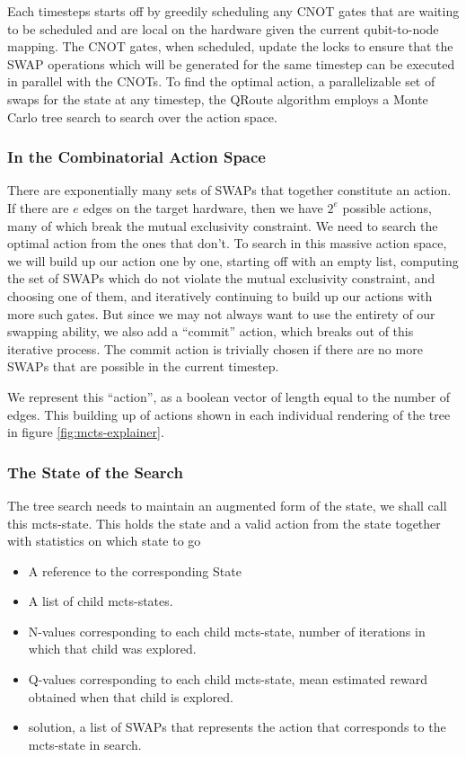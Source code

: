 \documentclass[%
 reprint,
 amsmath,amssymb,
 aps,
]{revtex4-2}
\begin{document}
Each timesteps starts off by greedily scheduling any CNOT gates that are waiting to be scheduled and are local on the hardware given the current qubit-to-node mapping. The CNOT gates, when scheduled, update the locks to ensure that the SWAP operations which will be generated for the same timestep can be executed in parallel with the CNOTs.
To find the optimal action, a parallelizable set of swaps for the state at any timestep, the QRoute algorithm employs a Monte Carlo tree search to search over the action space.

\subsubsection{\label{sec:method-mcts-state}In the Combinatorial Action Space}

There are exponentially many sets of SWAPs that together constitute an action. If there are $e$ edges on the target hardware, then we have $2^e$ possible actions, many of which break the mutual exclusivity constraint. We need to search the optimal action from the ones that don't. To search in this massive action space, we will build up our action one by one, starting off with an empty list, computing the set of SWAPs which do not violate the mutual exclusivity constraint, and choosing one of them, and iteratively continuing to build up our actions with more such gates. But since we may not always want to use the entirety of our swapping ability, we also add a ``commit'' action, which breaks out of this iterative process. The commit action is trivially chosen if there are no more SWAPs that are possible in the current timestep.

We represent this ``action'', as a boolean vector of length equal to the number of edges. This building up of actions shown in each individual rendering of the tree in figure \ref{fig:mcts-explainer}.

\subsubsection{\label{sec:method-mcts-state}The State of the Search}

The tree search needs to maintain an augmented form of the state, we shall call this mcts-state. This holds the state and a valid action from the state together with statistics on which state to go
\begin{itemize}
    \item A reference to the corresponding State
    \item A list of child mcts-states.
    \item N-values corresponding to each child mcts-state, number of iterations in which that child was explored.
    \item Q-values corresponding to each child mcts-state, mean estimated reward obtained when that child is explored.
    \item solution, a list of SWAPs that represents the action that corresponds to the mcts-state in search. 
\end{itemize}
\end{document}

